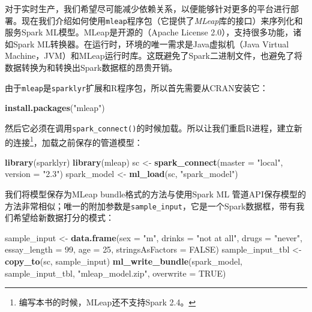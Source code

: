 \documentclass[
]{article}
\newenvironment{Shaded}{\begin{snugshade}}{\end{snugshade}}
\newcommand{\DataTypeTok}[1]{\textcolor[rgb]{0.13,0.29,0.53}{#1}}
\newcommand{\DecValTok}[1]{\textcolor[rgb]{0.00,0.00,0.81}{#1}}
\newcommand{\KeywordTok}[1]{\textcolor[rgb]{0.13,0.29,0.53}{\textbf{#1}}}
\newcommand{\NormalTok}[1]{#1}
\newcommand{\OtherTok}[1]{\textcolor[rgb]{0.56,0.35,0.01}{#1}}
\newcommand{\StringTok}[1]{\textcolor[rgb]{0.31,0.60,0.02}{#1}}
\begin{document}
对于实时生产，我们希望尽可能减少依赖关系，以便能够针对更多的平台进行部署。现在我们介绍如何使用\texttt{mleap}程序包（它提供了\emph{MLeap}库的接口）来序列化和服务Spark
ML模型。MLeap是开源的（Apache License 2.0），支持很多功能，诸如Spark
ML转换器。在运行时，环境的唯一需求是Java虚拟机（Java Virtual
Machine，JVM）和MLeap运行时库。这既避免了Spark二进制文件，也避免了将数据转换为和转换出Spark数据框的昂贵开销。

由于\texttt{mleap}是\texttt{sparklyr}扩展和R程序包，所以首先需要从CRAN安装它：

\begin{Shaded}
\begin{Highlighting}[]
\KeywordTok{install.packages}\NormalTok{(}\StringTok{"mleap"}\NormalTok{)}
\end{Highlighting}
\end{Shaded}

然后它必须在调用\texttt{spark\_connect()}的时候加载。所以让我们重启R进程，建立新的连接\footnote{编写本书的时候，MLeap还不支持Spark
  2.4。}，加载之前保存的管道模型：

\begin{Shaded}
\begin{Highlighting}[]
\KeywordTok{library}\NormalTok{(sparklyr)}
\KeywordTok{library}\NormalTok{(mleap)}
\NormalTok{sc <-}\StringTok{ }\KeywordTok{spark_connect}\NormalTok{(}\DataTypeTok{master =} \StringTok{"local"}\NormalTok{, }\DataTypeTok{version =} \StringTok{"2.3"}\NormalTok{)}
\NormalTok{spark_model <-}\StringTok{ }\KeywordTok{ml_load}\NormalTok{(sc, }\StringTok{"spark_model"}\NormalTok{)}
\end{Highlighting}
\end{Shaded}

我们将模型保存为MLeap bundle格式的方法与使用Spark ML
管道API保存模型的方法非常相似；唯一的附加参数是\texttt{sample\_input}，它是一个Spark数据框，带有我们希望给新数据打分的模式：

\begin{Shaded}
\begin{Highlighting}[]
\NormalTok{sample_input <-}\StringTok{ }\KeywordTok{data.frame}\NormalTok{(}\DataTypeTok{sex =} \StringTok{"m"}\NormalTok{, }\DataTypeTok{drinks =} \StringTok{"not at all"}\NormalTok{, }\DataTypeTok{drugs =} \StringTok{"never"}\NormalTok{, }\DataTypeTok{essay_length =} \DecValTok{99}\NormalTok{, }
    \DataTypeTok{age =} \DecValTok{25}\NormalTok{, }\DataTypeTok{stringsAsFactors =} \OtherTok{FALSE}\NormalTok{)}
\NormalTok{sample_input_tbl <-}\StringTok{ }\KeywordTok{copy_to}\NormalTok{(sc, sample_input)}
\KeywordTok{ml_write_bundle}\NormalTok{(spark_model, sample_input_tbl, }\StringTok{"mleap_model.zip"}\NormalTok{, }\DataTypeTok{overwrite =} \OtherTok{TRUE}\NormalTok{)}
\end{Highlighting}
\end{Shaded}
\end{document}
